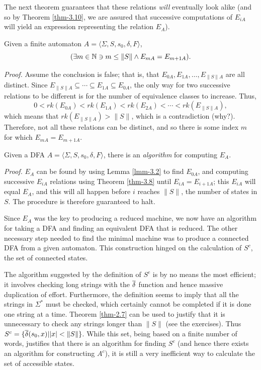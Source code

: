 The next theorem guarantees that these relations \emph{will} eventually look alike
(and so by Theorem \ref{thm-3.10}, we are assured that successive computations of $E_{iA}$
will yield an expression representing the relation $E_A$).

\begin{thm}\label{thm-3.11}
Given a finite automaton $A =\langle\Sigma,S,s_0,\delta,F\rangle$,
\[(\exists m \in \mathbb{N} \ni m \leq \|S\| \wedge E_{mA}=E_{m+1A}).\]

\emph{Proof.} Assume the conclusion is false; that is, that
$E_{0A},E_{1A}, \ldots ,E_{\|S\|A}$ are all distinct. Since
$E_{\|S\|A} \subseteq \cdots \subseteq E_{1A} \subseteq E_{0A}$, the only way
for two successive relations to be different is for the number of equivalence
classes to increase. Thus,
\[ 0 < rk(E_{0A}) < rk(E_{1A}) < rk(E_{2A}) < \cdots < rk(E_{\|S\|A}), \]
which means that $rk(E_{\|S\|A}) > \|S\|$, which is a contradiction (why?).
Therefore, not all these relations can be distinct, and so there is some index
$m$ for which $E_{mA} = E_{m+1A}$.
\end{thm}

\begin{cor}\label{cor-3.5}
Given a DFA $A=\langle\Sigma,S,s_0,\delta,F\rangle$, there is an \emph{algorithm} for
computing $E_A$.

\emph{Proof.} $E_A$ can be found by using Lemma \ref{lmm-3.2} to find $E_{0A}$, and
computing successive $E_{iA}$ relations using Theorem \ref{thm-3.8} until
$E_{iA}=E_{i+1A}$; this $E_{iA}$ will equal $E_A$, and this will all happen
before $i$ reaches $\|S\|$, the number of states in $S$. The procedure is
therefore guaranteed to halt.
\end{cor}

Since $E_A$ was the key to producing a reduced machine, we now have an algorithm
for taking a DFA and finding an equivalent DFA that is reduced. The other
necessary step needed to find the minimal machine was to produce a connected DFA
from a given automaton. This construction hinged on the calculation of $S^c$,
the set of connected states.

The algorithm suggested by the definition of $S^c$ is by no means the most
efficient; it involves checking long strings with the $\overline{\delta}$ function and hence
massive duplication of effort. Furthermore, the definition seems to imply that
all the strings in $\Sigma^*$ must be checked, which certainly cannot be
completed if it is done one string at a time. Theorem \ref{thm-2.7} can be used to justify
that it is unnecessary to check any strings longer than $\|S\|$ (see the
exercises). Thus $S^c = \{\overline{\delta}(s_0,x)| |x| < \|S\|\}$. While this set, being
based on a finite number of words, justifies that there is an algorithm for
finding $S^c$ (and hence there exists an algorithm for constructing $A^c$), it
is still a very inefficient way to calculate the set of accessible states.

